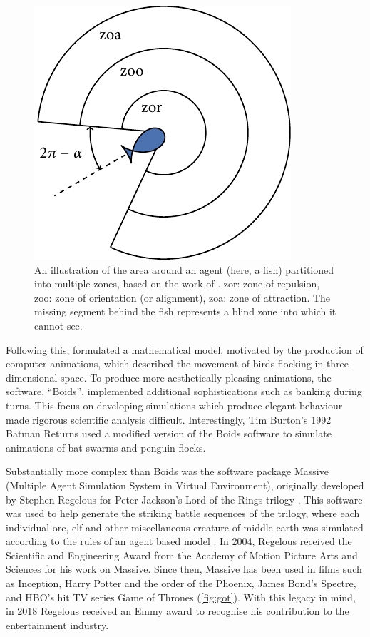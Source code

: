 \begin{figure}[tb]
	\includegraphics{zonal_tikz.pdf}
    \caption{An illustration of the area around an agent (here, a fish)
        partitioned into multiple zones, based on the work of
        \textcite{aoki82}. zor: zone of repulsion, zoo: zone of orientation (or
        alignment), zoa: zone of attraction. The missing segment behind the
        fish represents a blind zone into which it cannot see.}
	\label{fig:zone_illustration}
\end{figure}

Following this, \textcite{reynolds87} formulated a mathematical model,
motivated by the production of computer animations, which described the
movement of birds flocking in three-dimensional space. To produce more
aesthetically pleasing animations, the software, ``Boids'', implemented
additional sophistications such as banking during turns. This focus on
developing simulations which produce elegant behaviour made rigorous scientific
analysis difficult. Interestingly, Tim Burton's 1992 Batman Returns used a
modified version of the Boids software to simulate animations of bat swarms and
penguin flocks.

Substantially more complex than Boids was the software package Massive
(Multiple Agent Simulation System in Virtual Environment), originally developed
by Stephen Regelous for Peter Jackson's Lord of the Rings trilogy
\parencite{koeppel02}. This software was used to help generate the striking
battle sequences of the trilogy, where each individual orc, elf and other
miscellaneous creature of middle-earth was simulated according to the rules of
an agent based model \parencite{robbins17}. In 2004, Regelous received the
Scientific and Engineering Award from the Academy of Motion Picture Arts and
Sciences for his work on Massive. Since then, Massive has been used in films
such as Inception, Harry Potter and the order of the Phoenix, James Bond's
Spectre, and HBO's hit TV series Game of Thrones (\cref{fig:got}). With this
legacy in mind, in 2018 Regelous received an Emmy award to recognise his
contribution to the entertainment industry.

